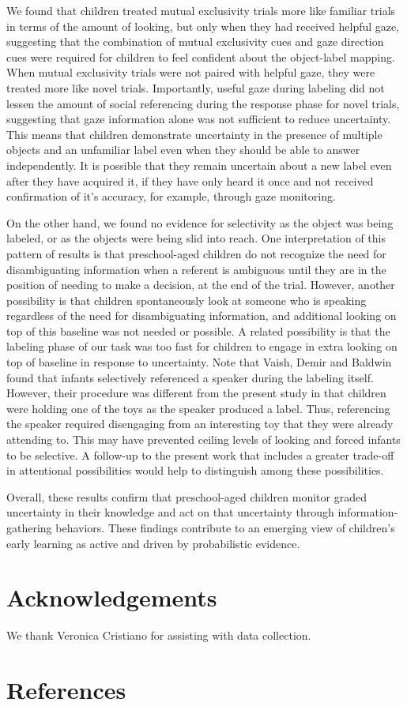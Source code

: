 \documentclass[10pt, letterpaper]{article}
\begin{document}
We found that children treated mutual exclusivity trials more like
familiar trials in terms of the amount of looking, but only when they
had received helpful gaze, suggesting that the combination of mutual
exclusivity cues and gaze direction cues were required for children to
feel confident about the object-label mapping. When mutual exclusivity
trials were not paired with helpful gaze, they were treated more like
novel trials. Importantly, useful gaze during labeling did not lessen
the amount of social referencing during the response phase for novel
trials, suggesting that gaze information alone was not sufficient to
reduce uncertainty. This means that children demonstrate uncertainty in
the presence of multiple objects and an unfamiliar label even when they
should be able to answer independently. It is possible that they remain
uncertain about a new label even after they have acquired it, if they
have only heard it once and not received confirmation of it's accuracy,
for example, through gaze monitoring.

On the other hand, we found no evidence for selectivity as the object
was being labeled, or as the objects were being slid into reach. One
interpretation of this pattern of results is that preschool-aged
children do not recognize the need for disambiguating information when a
referent is ambiguous until they are in the position of needing to make
a decision, at the end of the trial. However, another possibility is
that children spontaneously look at someone who is speaking regardless
of the need for disambiguating information, and additional looking on
top of this baseline was not needed or possible. A related possibility
is that the labeling phase of our task was too fast for children to
engage in extra looking on top of baseline in response to uncertainty.
Note that Vaish, Demir and Baldwin found that infants selectively
referenced a speaker during the labeling itself. However, their
procedure was different from the present study in that children were
holding one of the toys as the speaker produced a label. Thus,
referencing the speaker required disengaging from an interesting toy
that they were already attending to. This may have prevented ceiling
levels of looking and forced infants to be selective. A follow-up to the
present work that includes a greater trade-off in attentional
possibilities would help to distinguish among these possibilities.

Overall, these results confirm that preschool-aged children monitor
graded uncertainty in their knowledge and act on that uncertainty
through information-gathering behaviors. These findings contribute to an
emerging view of children's early learning as active and driven by
probabilistic evidence.

\section{Acknowledgements}\label{acknowledgements}

We thank Veronica Cristiano for assisting with data collection.

\section{References}\label{references}

\setlength{\parindent}{-0.1in} \setlength{\leftskip}{0.125in} \noindent
\end{document}
